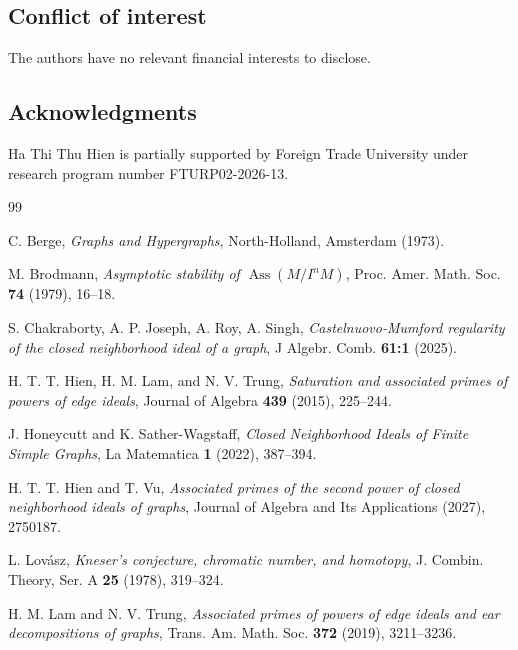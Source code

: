 \documentclass[12pt,reqno,twoside]{amsart}
\DeclareMathOperator{\Ass}{Ass}
\theoremstyle{definition}
\theoremstyle{plain}
\theoremstyle{remark}
\numberwithin{equation}{section}
\begin{document}
\subsection*{Conflict of interest}

The authors have no relevant financial interests to disclose.



\subsection*{Acknowledgments}
Ha Thi Thu Hien is partially supported by Foreign Trade University under research program number FTURP02-2026-13.

\begin{thebibliography}{99}


C. Berge, 
{\em Graphs and Hypergraphs}, North-Holland, Amsterdam (1973).


 M. Brodmann, 
\emph{Asymptotic stability of $\Ass (M/I^nM)$}, Proc. Amer. Math. Soc. {\bf 74} (1979), 16--18.


S. Chakraborty, A. P. Joseph, A. Roy, A. Singh,
\emph{Castelnuovo-Mumford regularity of the closed neighborhood ideal of a graph}, J Algebr. Comb. {\bf 61:1} (2025).






H. T. T. Hien, H. M. Lam, and N. V. Trung,
{\em Saturation and associated primes of powers of edge ideals}, Journal of Algebra {\bf 439} (2015), 225--244.


J. Honeycutt and K. Sather-Wagstaff, \emph{Closed Neighborhood Ideals of Finite Simple Graphs}, La Matematica {\bf 1} (2022), 387--394.

 
H. T. T. Hien and T. Vu,
\emph{Associated primes of the second power of closed neighborhood ideals of graphs}, Journal of Algebra and Its Applications (2027), 2750187.


 L. Lov\'asz, 
{\em Kneser's conjecture, chromatic number, and homotopy}, J. Combin. Theory, Ser. A {\bf 25} (1978), 319--324.

H. M. Lam and N. V. Trung,
{\em Associated primes of powers of edge ideals and ear decompositions of graphs}, Trans. Am. Math. Soc. {\bf 372} (2019), 3211--3236.



\end{thebibliography}
\end{document}
